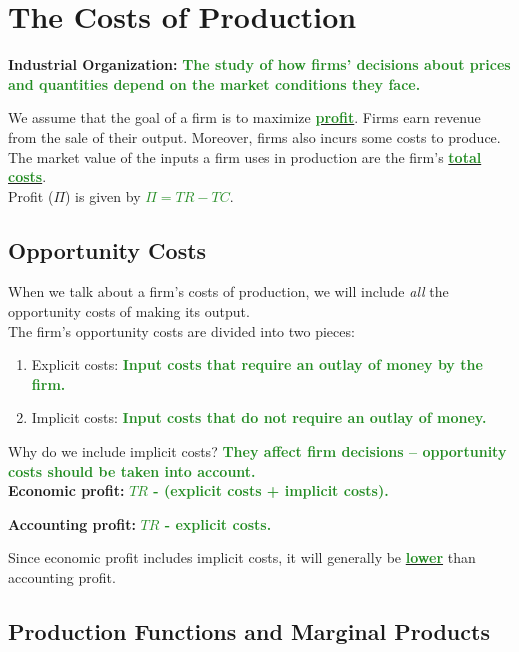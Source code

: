 \documentclass[11pt]{article}\usepackage[]{graphicx}\usepackage[]{color}
\theoremstyle{definition}
\newcommand{\ddp}[1]{{\textbf{\textcolor{ForestGreen}{#1}}}}
\newcommand{\dd}[1]{{\underline{\textbf{\textcolor{ForestGreen}{#1}}}}}
\newcommand{\defn}[1]{\textbf{#1}}
\begin{document}
	\section{The Costs of Production}
	
	\defn{Industrial Organization:} \ddp{The study of how firms' decisions about prices and quantities depend on the market conditions they face.\\}
	
	We assume that the goal of a firm is to maximize \dd{profit}. Firms earn revenue from the sale of their output. Moreover, firms also incurs some costs to produce. The market value of the inputs a firm uses in production are the firm's \dd{total costs}.
	\\
	
	Profit ($\Pi$) is given by \dd{$\Pi = TR - TC$}.

	\subsection{Opportunity Costs}
	
	When we talk about a firm's costs of production, we will include \textit{all} the opportunity costs of making its output. 
	\\
	
	The firm's opportunity costs are divided into two pieces:
	\begin{enumerate}
		\itemsep1em 
		\item Explicit costs: \ddp{Input costs that require an outlay of money by the firm.}
		\item Implicit costs: \ddp{Input costs that do not require an outlay of money.}
	\end{enumerate}
	\vspace{.25cm}
	
	Why do we include implicit costs? \ddp{They affect firm decisions -- opportunity costs should be taken into account.}
	\\

	\defn{Economic profit:} \ddp{$TR$ - (explicit costs + implicit costs). \\}
	
	\defn{Accounting profit:} \ddp{$TR$ - explicit costs.\\}
	
	Since economic profit includes implicit costs, it will generally be \dd{lower} than accounting profit.
	
	\subsection{Production Functions and Marginal Products}
	
\end{document}
